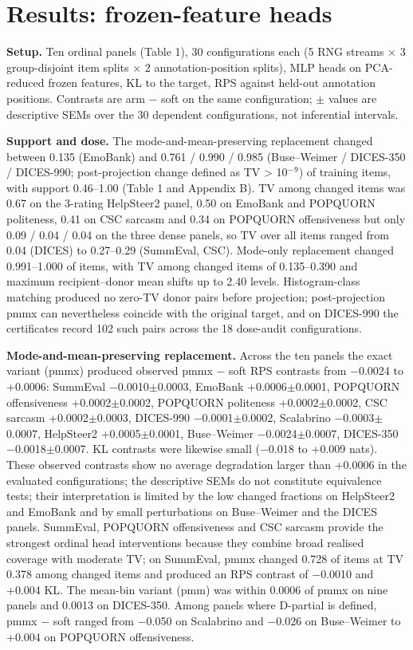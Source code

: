 \documentclass[10pt]{article}
\begin{document}
\section{Results: frozen-feature heads}


\textbf{Setup.} Ten ordinal panels (Table 1), 30 configurations each (5 RNG streams $\times$ 3 group-disjoint item splits $\times$ 2 annotation-position splits), MLP heads on PCA-reduced frozen features, KL to the target, RPS against held-out annotation positions. Contrasts are arm $-$ soft on the same configuration; $\pm$ values are descriptive SEMs over the 30 dependent configurations, not inferential intervals.

\textbf{Support and dose.} The mode-and-mean-preserving replacement changed between 0.135 (EmoBank) and 0.761 / 0.990 / 0.985 (Buse--Weimer / DICES-350 / DICES-990; post-projection change defined as TV \textgreater{} 10$^{-}$$^{9}$) of training items, with support 0.46--1.00 (Table 1 and Appendix B). TV among changed items was 0.67 on the 3-rating HelpSteer2 panel, 0.50 on EmoBank and POPQUORN politeness, 0.41 on CSC sarcasm and 0.34 on POPQUORN offensiveness but only 0.09 / 0.04 / 0.04 on the three dense panels, so TV over all items ranged from 0.04 (DICES) to 0.27--0.29 (SummEval, CSC). Mode-only replacement changed 0.991--1.000 of items, with TV among changed items of 0.135--0.390 and maximum recipient--donor mean shifts up to 2.40 levels. Histogram-class matching produced no zero-TV donor pairs before projection; post-projection pmmx can nevertheless coincide with the original target, and on DICES-990 the certificates record 102 such pairs across the 18 dose-audit configurations.

\textbf{Mode-and-mean-preserving replacement.} Across the ten panels the exact variant (pmmx) produced observed pmmx $-$ soft RPS contrasts from $-$0.0024 to +0.0006: SummEval $-$0.0010$\pm$0.0003, EmoBank +0.0006$\pm$0.0001, POPQUORN offensiveness +0.0002$\pm$0.0002, POPQUORN politeness +0.0002$\pm$0.0002, CSC sarcasm +0.0002$\pm$0.0003, DICES-990 $-$0.0001$\pm$0.0002, Scalabrino $-$0.0003$\pm$0.0007, HelpSteer2 +0.0005$\pm$0.0001, Buse--Weimer $-$0.0024$\pm$0.0007, DICES-350 $-$0.0018$\pm$0.0007. KL contrasts were likewise small ($-$0.018 to +0.009 nats). These observed contrasts show no average degradation larger than +0.0006 in the evaluated configurations; the descriptive SEMs do not constitute equivalence tests; their interpretation is limited by the low changed fractions on HelpSteer2 and EmoBank and by small perturbations on Buse--Weimer and the DICES panels. SummEval, POPQUORN offensiveness and CSC sarcasm provide the strongest ordinal head interventions because they combine broad realised coverage with moderate TV; on SummEval, pmmx changed 0.728 of items at TV 0.378 among changed items and produced an RPS contrast of $-$0.0010 and +0.004 KL. The mean-bin variant (pmm) was within 0.0006 of pmmx on nine panels and 0.0013 on DICES-350. Among panels where D-partial is defined, pmmx $-$ soft ranged from $-$0.050 on Scalabrino and $-$0.026 on Buse--Weimer to +0.004 on POPQUORN offensiveness.
\end{document}
